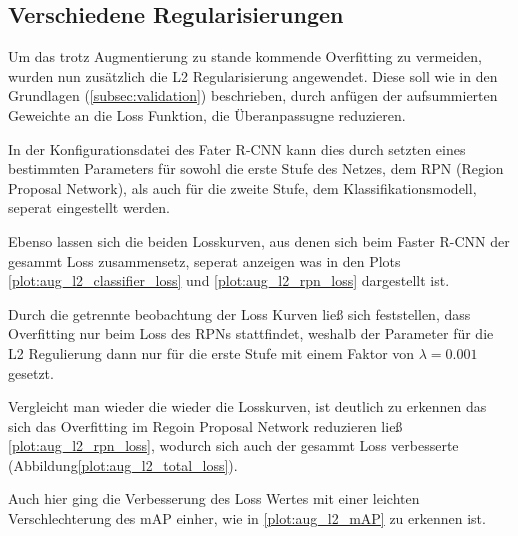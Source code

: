 \subsection{Verschiedene Regularisierungen}

Um das trotz Augmentierung zu stande kommende Overfitting zu 
vermeiden, wurden nun zusätzlich die L2 Regularisierung angewendet.
Diese soll wie in den Grundlagen (\ref{subsec:validation}) beschrieben, 
durch anfügen der aufsummierten Geweichte an die Loss Funktion, 
die Überanpassugne reduzieren.

In der Konfigurationsdatei des Fater R-CNN kann dies durch setzten eines 
bestimmten Parameters für sowohl die erste Stufe des Netzes, 
dem RPN (Region Proposal Network), als auch für die zweite Stufe,
dem Klassifikationsmodell, seperat eingestellt werden.


Ebenso lassen sich die beiden Losskurven, aus denen sich 
beim Faster R-CNN der gesammt Loss zusammensetz,
seperat anzeigen was in den 
Plots \ref{plot:aug_l2_classifier_loss}
und \ref{plot:aug_l2_rpn_loss} dargestellt ist.

Durch die getrennte beobachtung der Loss Kurven ließ sich 
feststellen, dass Overfitting nur  beim Loss des RPNs 
stattfindet, weshalb der Parameter für die L2 Regulierung 
dann nur für die erste Stufe mit einem Faktor von
$\lambda = 0.001$ gesetzt.

Vergleicht man wieder die wieder die Losskurven, ist deutlich zu 
erkennen das sich das Overfitting im Regoin Proposal Network 
reduzieren ließ \ref{plot:aug_l2_rpn_loss}, wodurch sich 
auch der gesammt Loss verbesserte (Abbildung\ref{plot:aug_l2_total_loss}).

Auch hier ging die Verbesserung des Loss Wertes mit einer
leichten Verschlechterung des mAP einher, wie in 
\ref{plot:aug_l2_mAP} zu erkennen ist.



